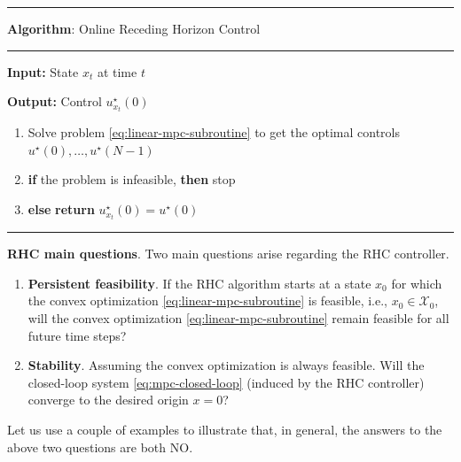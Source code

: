 \documentclass[
]{book}
\providecommand{\tightlist}{%
  \setlength{\itemsep}{0pt}\setlength{\parskip}{0pt}}
\theoremstyle{definition}
\theoremstyle{definition}
\theoremstyle{definition}
\theoremstyle{definition}
\theoremstyle{remark}
\begin{document}
\begin{center}\rule{0.5\linewidth}{0.5pt}\end{center}

\textbf{Algorithm}: Online Receding Horizon Control

\begin{center}\rule{0.5\linewidth}{0.5pt}\end{center}

\textbf{Input:} State \(x_t\) at time \(t\)

\textbf{Output:} Control \(u^\star_{x_t}(0)\)

\begin{enumerate}
\def\labelenumi{\arabic{enumi}.}
\tightlist
\item
  Solve problem \eqref{eq:linear-mpc-subroutine} to get the optimal controls \(u^\star(0), \dots, u^\star(N-1)\)
\item
  \textbf{if} the problem is infeasible, \textbf{then} stop
\item
  \textbf{else} \textbf{return} \(u^\star_{x_t}(0) = u^\star(0)\)
\end{enumerate}

\begin{center}\rule{0.5\linewidth}{0.5pt}\end{center}

\textbf{RHC main questions}. Two main questions arise regarding the RHC controller.

\begin{enumerate}
\def\labelenumi{\arabic{enumi}.}
\item
  \textbf{Persistent feasibility}. If the RHC algorithm starts at a state \(x_0\) for which the convex optimization \eqref{eq:linear-mpc-subroutine} is feasible, i.e., \(x_0 \in \mathcal{X}_0\), will the convex optimization \eqref{eq:linear-mpc-subroutine} remain feasible for all future time steps?
\item
  \textbf{Stability}. Assuming the convex optimization is always feasible. Will the closed-loop system \eqref{eq:mpc-closed-loop} (induced by the RHC controller) converge to the desired origin \(x=0\)?
\end{enumerate}

Let us use a couple of examples to illustrate that, in general, the answers to the above two questions are both NO.
\end{document}

